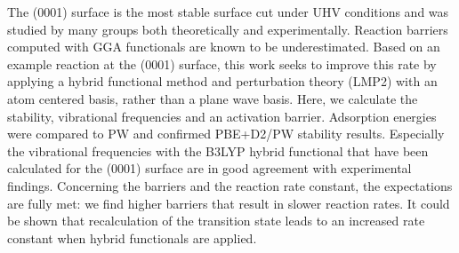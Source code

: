 \documentclass[11pt,DIV=13,BCOR=5mm,a4paper,headinclude]{scrbook}
\begin{document}
% 


The (0001) surface is the most stable surface cut under UHV conditions and was studied by many groups both theoretically and experimentally.
Reaction barriers computed with GGA functionals are known to be underestimated.
Based on an example reaction at the (0001) surface, this work seeks to improve this rate by applying a hybrid functional method and perturbation theory (LMP2) with an atom centered basis, rather than a plane wave basis.
Here, we calculate the stability, vibrational frequencies and an activation barrier.
Adsorption energies were compared to PW and confirmed PBE+D2/PW stability results.
Especially the vibrational frequencies with the B3LYP hybrid functional that have been calculated for the (0001) surface are in good agreement with experimental findings.
Concerning the barriers and the reaction rate constant, the expectations are fully met: we find higher barriers that result in slower reaction rates.
It could be shown that recalculation of the transition state leads to an increased rate constant when hybrid functionals are applied.
\\\\
\end{document}

